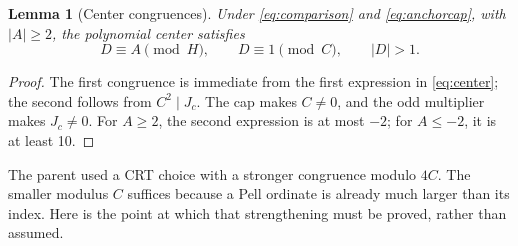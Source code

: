 \documentclass[11pt,letterpaper]{article}
\newtheorem{lemma}[theorem]{Lemma}
\theoremstyle{definition}\newtheorem{definition}[theorem]{Definition}
\theoremstyle{remark}\newtheorem{remark}[theorem]{Remark}
\begin{document}
\begin{lemma}[Center congruences]\label{lem:center}
Under \eqref{eq:comparison} and \eqref{eq:anchorcap}, with \(|A|\ge2\), the polynomial center satisfies
\[
 D\equiv A\pmod H,\qquad D\equiv1\pmod C,\qquad |D|>1.
\]
\end{lemma}
\begin{proof}
The first congruence is immediate from the first expression in \eqref{eq:center}; the second follows from \(C^2\mid J_c\). The cap makes \(C\ne0\), and the odd multiplier makes \(J_c\ne0\). For \(A\ge2\), the second expression is at most \(-2\); for \(A\le-2\), it is at least 10.
\end{proof}

The parent used a CRT choice with a stronger congruence modulo \(4C\). The smaller modulus \(C\) suffices because a Pell ordinate is already much larger than its index. Here is the point at which that strengthening must be proved, rather than assumed.
\end{document}
